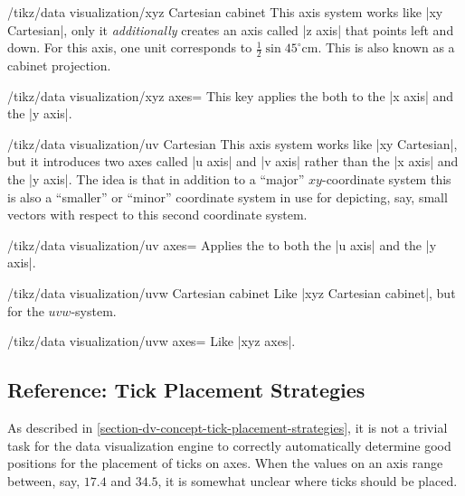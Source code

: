 \begin{key}{/tikz/data visualization/xyz Cartesian cabinet}
  This axis system works like |xy Cartesian|, only it
  \emph{additionally} creates an axis called |z axis| that points left
  and down. For this axis, one unit corresponds to $\frac{1}{2}\sin
  45^\circ\mathrm{cm}$. This is also known as a cabinet projection.

  \begin{key}{/tikz/data visualization/xyz axes=}
    This key applies the  both to the |x axis| and the
    |y axis|.
  \end{key}

\end{key}


\begin{key}{/tikz/data visualization/uv Cartesian}
  This axis system works like |xy Cartesian|, but it introduces two
  axes called |u axis| and |v axis| rather than the |x axis| and the
  |y axis|. The idea is that in addition to a ``major''
  $xy$-coordinate system this is also a ``smaller'' or ``minor''
  coordinate system in use for depicting, say, small vectors with
  respect to this second coordinate system.

  \begin{key}{/tikz/data visualization/uv axes=}
    Applies the  to both the |u axis| and the |y axis|.
  \end{key}

\end{key}

\begin{key}{/tikz/data visualization/uvw Cartesian cabinet}
  Like |xyz Cartesian cabinet|, but for the $uvw$-system.

  \begin{key}{/tikz/data visualization/uvw axes=}
    Like |xyz axes|.
  \end{key}
\end{key}



\subsection{Reference: Tick Placement Strategies}
\label{section-dv-tick-placement-strategies}

As described in \ref{section-dv-concept-tick-placement-strategies},
it is not a trivial task for the data visualization engine to
correctly automatically determine good positions for the placement of
ticks on axes. When the values on an axis range between, say, $17.4$
and $34.5$, it is somewhat unclear where ticks should be placed.


